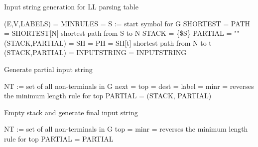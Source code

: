 \begin{algorithm}
\caption{Input string generation for LL parsing table}
\label{algo:inputstr gen}
\begin{algorithmic}[1]
\State (E,V,LABELS) = 
\State MINRULES = 
\State S := start symbol for G
\State SHORTEST = 
\State PATH = SHORTEST[N] \Comment shortest path from S to N
\State STACK = \{\$S\}
\State PARTIAL = ""
\State (STACK,PARTIAL) = 
\State SH = 
\State PH = SH[t] \Comment shortest path from N to t
\State (STACK,PARTIAL) = 
\State INPUTSTRING = 
\State \Return INPUTSTRING
\EndFunction
\end{algorithmic}
\end{algorithm}

\begin{algorithm}
\caption{Generate partial input string}
\label{algo:find input}
\begin{algorithmic}[1]
\State NT := set of all non-terminals in G
\State next = 
\State top = 
\State dest = 
\State label = 
\State {}
\Else
{}
\State minr =  \Comment reverses the minimum length rule for top
\State {}
\Else
\State PARTIAL =  
\EndIf
\EndIf
\EndWhile
\State \Return (STACK, PARTIAL)
\EndFunction
\end{algorithmic}
\end{algorithm}

\begin{algorithm}
\caption{Empty stack and generate final input string}
\label{algo:stack empty}
\begin{algorithmic}[1]
\State NT := set of all non-terminals in G
\State top = 
\State minr =  \Comment reverses the minimum length rule for top
\State {}
\Else
\State PARTIAL =  
\EndIf				
\EndWhile
\State \Return PARTIAL
\EndFunction
\end{algorithmic}
\end{algorithm}

